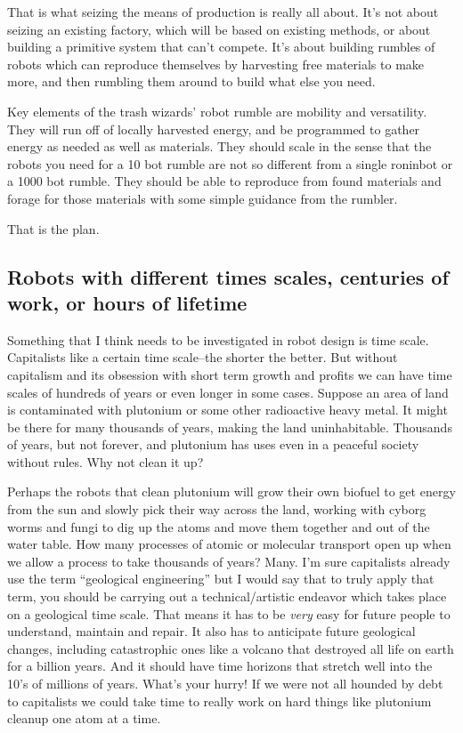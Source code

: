 That is what seizing the means of production is really all about. It's
not about seizing an existing factory, which will be based on existing
methods, or about building a primitive system that can't compete. It's
about building rumbles of robots which can reproduce themselves by
harvesting free materials to make more, and then rumbling them around to
build what else you need.

Key elements of the trash wizards' robot rumble are mobility and
versatility. They will run off of locally harvested energy, and be
programmed to gather energy as needed as well as materials. They should
scale in the sense that the robots you need for a 10 bot rumble are not
so different from a single roninbot or a 1000 bot rumble. They should be
able to reproduce from found materials and forage for those materials
with some simple guidance from the rumbler.

That is the plan.

\subsection{Robots with different times scales, centuries of work, or
hours of
lifetime}\label{robots-with-different-times-scales-centuries-of-work-or-hours-of-lifetime}

Something that I think needs to be investigated in robot design is time
scale. Capitalists like a certain time scale--the shorter the better.
But without capitalism and its obsession with short term growth and
profits we can have time scales of hundreds of years or even longer in
some cases. Suppose an area of land is contaminated with plutonium or
some other radioactive heavy metal. It might be there for many thousands
of years, making the land uninhabitable. Thousands of years, but not
forever, and plutonium has uses even in a peaceful society without
rules. Why not clean it up?

Perhaps the robots that clean plutonium will grow their own biofuel to
get energy from the sun and slowly pick their way across the land,
working with cyborg worms and fungi to dig up the atoms and move them
together and out of the water table. How many processes of atomic or
molecular transport open up when we allow a process to take thousands of
years? Many. I'm sure capitalists already use the term ``geological
engineering'' but I would say that to truly apply that term, you should
be carrying out a technical/artistic endeavor which takes place on a
geological time scale. That means it has to be \emph{very} easy for
future people to understand, maintain and repair. It also has to
anticipate future geological changes, including catastrophic ones like a
volcano that destroyed all life on earth for a billion years. And it
should have time horizons that stretch well into the 10's of millions of
years. What's your hurry! If we were not all hounded by debt to
capitalists we could take time to really work on hard things like
plutonium cleanup one atom at a time.

